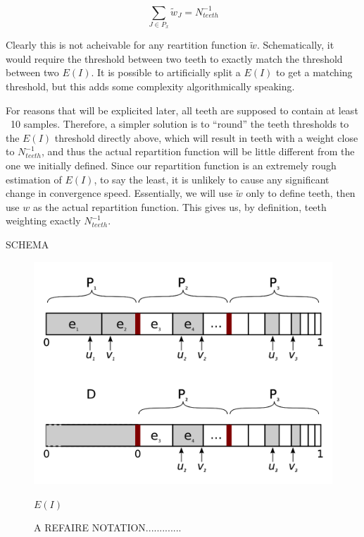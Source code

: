 \documentclass[./thesis.tex]{subfiles}
\begin{document}
$$\sum_{J \in P_x} \tilde w_J = N_{teeth}^{-1}$$

Clearly this is not acheivable for any reartition function $\tilde w$. Schematically, it would require the threshold between two teeth to exactly match the threshold between two $E(I)$. It is possible to artificially split a $E(I)$ to get a matching threshold, but this adds some complexity algorithmically speaking.



For reasons that will be explicited later, all teeth are supposed to contain at least ~10 samples. Therefore, a simpler solution is to ``round'' the teeth thresholds to the $E(I)$ threshold directly above, which will result in teeth with a weight close to $N_{teeth}^{-1}$, and thus the actual repartition function will be little different from the one we initially defined. Since our repartition function is an extremely rough estimation of $E(I)$, to say the least, it is unlikely to cause any significant change in convergence speed.
Essentially, we will use $\tilde w$ only to define teeth, then use $w$ as the actual repartition function. This gives us, by definition, teeth weighting exactly $N_{teeth}^{-1}$.


SCHEMA




\begin{figure}[h!]
	\begin{center}
		\includegraphics[width=0.9\columnwidth]{figures/pt2/move_to_deterministic}
		\caption{A REFAIRE NOTATION.............}
		\label{fig:move_to_deterministic}
		$E(I)$
	\end{center}
\end{figure}
\end{document}
